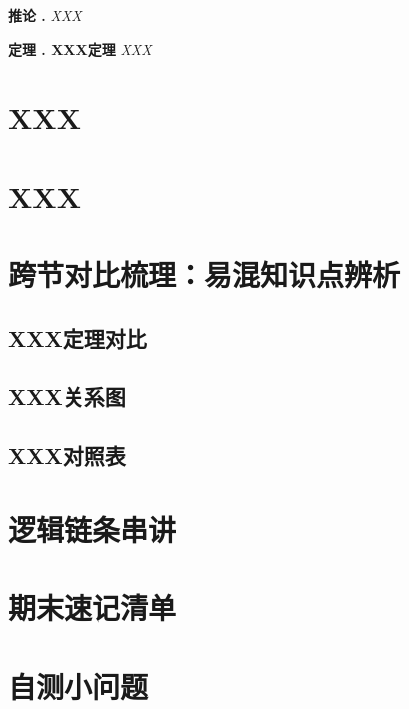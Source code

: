 \documentclass[11pt,a4paper]{article}
\theoremstyle{plain}
\newtheorem{theorem}{定理}[section]
\newtheorem{corollary}{推论}[section]
\renewenvironment{theorem}[1][]
  {\par\vspace{3pt}\normalfont\textbf{定理 \thetheorem. #1}\itshape}
  {\par\vspace{2pt}}
\renewenvironment{corollary}[1][]
  {\par\vspace{3pt}\normalfont\textbf{推论 \thecorollary. #1}\itshape}
  {\par\vspace{2pt}}
\begin{document}
\begin{corollary}
XXX
\end{corollary}

\begin{theorem}[XXX定理]
XXX
\end{theorem}

\section{XXX}
\section{XXX}

\section{跨节对比梳理：易混知识点辨析}

\subsection{XXX定理对比}

\subsection{XXX关系图}

\subsection{XXX对照表}

\section{逻辑链条串讲}

\section{期末速记清单}

\section{自测小问题}
\end{document}
